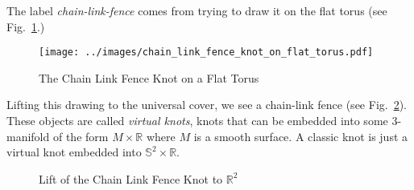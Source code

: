 \documentclass{article}
\theoremstyle{plain}
\begin{document}
        The label \textit{chain-link-fence} comes from trying to draw it
        on the flat torus
        (see Fig.~\ref{fig:chain_link_fence_knot_on_flat_torus}.)
        \begin{figure}
            \centering
            \texttt{[image: ../images/chain\_link\_fence\_knot\_on\_flat\_torus.pdf]}
            \caption{The Chain Link Fence Knot on a Flat Torus}
            \label{fig:chain_link_fence_knot_on_flat_torus}
        \end{figure}
        Lifting this drawing to the universal cover, we see a chain-link fence
        (see Fig.~\ref{fig:chain_link_fence_knot_on_flat_torus_universal_cover}).
        These objects are called \textit{virtual knots}, knots that can be
        embedded into some 3-manifold of the form $M\times\mathbb{R}$ where
        $M$ is a smooth surface. A classic knot is just a virtual knot embedded
        into $\mathbb{S}^{2}\times\mathbb{R}$.
        \begin{figure}
            \centering
            \caption{Lift of the Chain Link Fence Knot to $\mathbb{R}^{2}$}
            \label{fig:chain_link_fence_knot_on_flat_torus_universal_cover}
        \end{figure}
\end{document}
